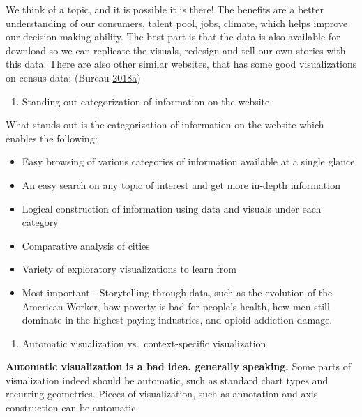 \documentclass[]{book}
\providecommand{\tightlist}{%
  \setlength{\itemsep}{0pt}\setlength{\parskip}{0pt}}
\theoremstyle{definition}
\theoremstyle{definition}
\theoremstyle{definition}
\theoremstyle{remark}
\begin{document}
We think of a topic, and it is possible it is there! The benefits are a
better understanding of our consumers, talent pool, jobs, climate, which
helps improve our decision-making ability. The best part is that the
data is also available for download so we can replicate the visuals,
redesign and tell our own stories with this data. There are also other
similar websites, that has some good visualizations on census data:
(Bureau
\protect\hyperlink{ref-CensusDataViz}{2018}\protect\hyperlink{ref-CensusDataViz}{a})

\begin{enumerate}
\def\labelenumi{\arabic{enumi}.}
\setcounter{enumi}{1}
\tightlist
\item
  Standing out categorization of information on the website.
\end{enumerate}

What stands out is the categorization of information on the website
which enables the following:

\begin{itemize}
\tightlist
\item
  Easy browsing of various categories of information available at a
  single glance
\item
  An easy search on any topic of interest and get more in-depth
  information
\item
  Logical construction of information using data and visuals under each
  category
\item
  Comparative analysis of cities
\item
  Variety of exploratory visualizations to learn from
\item
  Most important - Storytelling through data, such as the evolution of
  the American Worker, how poverty is bad for people's health, how men
  still dominate in the highest paying industries, and opioid addiction
  damage.
\end{itemize}

\begin{enumerate}
\def\labelenumi{\arabic{enumi}.}
\setcounter{enumi}{2}
\tightlist
\item
  Automatic visualization vs.~context-specific visualization
\end{enumerate}

\textbf{Automatic visualization is a bad idea, generally speaking.} Some
parts of visualization indeed should be automatic, such as standard
chart types and recurring geometries. Pieces of visualization, such as
annotation and axis construction can be automatic.
\end{document}

